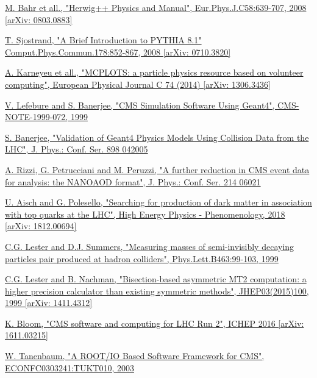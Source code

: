 \documentclass[a4paper, 10pt, openright]{report}
\begin{document}
\begin{thebibliography}{1}
\href{https://arxiv.org/abs/0803.0883}{M. Bahr et all.,
"Herwig++ Physics and Manual",
Eur.Phys.J.C58:639-707, 2008 [arXiv: 0803.0883]}

\href{https://arxiv.org/abs/0710.3820}{T. Sjostrand,
"A Brief Introduction to PYTHIA 8.1"
Comput.Phys.Commun.178:852-867, 2008 [arXiv: 0710.3820]}

\href{https://arxiv.org/abs/1306.3436}{A. Karneyeu et all.,
"MCPLOTS: a particle physics resource based on volunteer computing",
European Physical Journal C 74 (2014) [arXiv: 1306.3436]}

\href{http://inspirehep.net/record/876352}{V. Lefebure and S. Banerjee,
"CMS Simulation Software Using Geant4",
CMS-NOTE-1999-072, 1999}

\href{https://iopscience.iop.org/article/10.1088/1742-6596/898/4/042005/pdf}{S. Banerjee,
"Validation of Geant4 Physics Models Using Collision Data from the LHC",
J. Phys.: Conf. Ser. 898 042005}

\href{https://www.researchgate.net/publication/335864848_A_further_reduction_in_CMS_event_data_for_analysis_the_NANOAOD_format}{A. Rizzi, G. Petrucciani and M. Peruzzi,
"A further reduction in CMS event data for analysis: the NANOAOD format",
J. Phys.: Conf. Ser. 214 06021}

\href{https://arxiv.org/abs/1812.00694}{U. Aisch and G. Polesello,
"Searching for production of dark matter in association with top quarks at the LHC",
High Energy Physics - Phenomenology, 2018 [arXiv: 1812.00694]}

\href{https://arxiv.org/abs/hep-ph/9906349}{C.G. Lester and D.J. Summers,
"Measuring masses of semi-invisibly decaying particles pair produced at hadron colliders",
Phys.Lett.B463:99-103, 1999}

\href{https://arxiv.org/abs/1411.4312}{C.G. Lester and B. Nachman,
"Bisection-based asymmetric MT2 computation: a higher precision calculator than existing symmetric methods",
JHEP03(2015)100, 1999 [arXiv: 1411.4312]}

\href{https://arxiv.org/abs/1611.03215}{K. Bloom,
"CMS software and computing for LHC Run 2",
ICHEP 2016 [arXiv: 1611.03215]}

\href{https://arxiv.org/abs/cs/0306034}{W. Tanenbaum,
"A ROOT/IO Based Software Framework for CMS",
ECONFC0303241:TUKT010, 2003}


\end{thebibliography}
\end{document}
